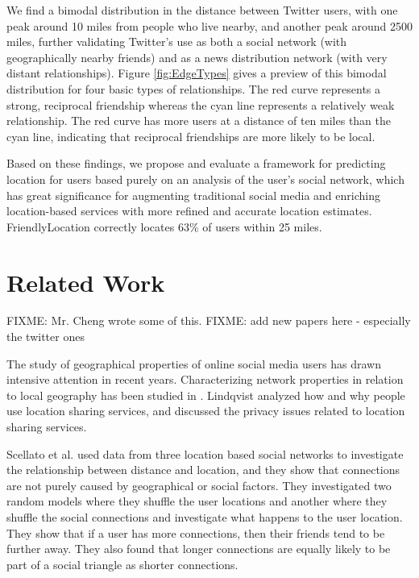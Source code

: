 We find a bimodal distribution in the distance between Twitter users, with one
peak around 10 miles from people who live nearby, and another peak around 2500
miles, further validating Twitter's use as both a social network (with
geographically nearby friends) and as a news distribution network (with very
distant relationships).  Figure \ref{fig:EdgeTypes} gives a preview of this
bimodal distribution for four basic types of relationships.  The red curve
represents a strong, reciprocal friendship whereas the cyan line represents a
relatively weak relationship. The red curve has more users at a distance of ten
miles than the cyan line, indicating that reciprocal friendships are more
likely to be local.

Based on these findings, we propose and evaluate a framework for predicting
location for users based purely on an analysis of the user's social network,
which has great significance for augmenting traditional social media and
enriching location-based services with more refined and accurate location
estimates.  FriendlyLocation correctly locates 63\% of users within 25 miles.

\section{Related Work}

FIXME: Mr. Cheng wrote some of this.
FIXME: add new papers here - especially the twitter ones

The study of geographical properties of online social media users has drawn
intensive attention in recent years.  Characterizing network properties in
relation to local geography has been studied in \cite{yardi2010tweeting}.
Lindqvist \cite{lindqvist2011m} analyzed how and why people use location
sharing services, and discussed the privacy issues related to location sharing
services.

Scellato et al. \cite{scellato2011socio} used data from three location based
social networks to investigate the relationship between distance and location,
and they show that connections are not purely caused by geographical or social
factors.  They investigated two random models where they shuffle the user
locations and another where they shuffle the social connections and investigate
what happens to the user location.  They show that if a user has more
connections, then their friends tend to be further away.  They also found that
longer connections are equally likely to be part of a social triangle as
shorter connections.

